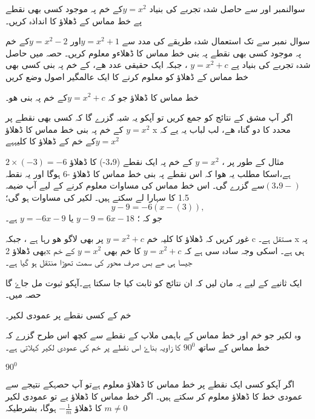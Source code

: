 

سوالنمبر  اور سے حاصل شدہ تجربے کی بنیاد \( y=x^{2} \)کے خم پہ موجود کسی بھی نقطے پے خط مماس کے ڈھلاؤ کا انداذہ کریں۔

 
سوال نمبر  سے  تک استعمال شدہ طریقے کی مدد سے \( y=x^{2} +1 \)اور \( y=x^{2} -2 \)کے خم پہ موجود کسی بھی نقطے پہ بنی خط مماس  کا ڈھلاءو معلوم کریں۔
حصہ  میں حاصل شدہ تجربے کی بنیاد پے
\( y=x^{2} +c \) 
، جبکہ  ایک حقیقی عدد ھے،   کے خم پہ بنی کسی بھی خط مماس کے ڈھلاؤ کو معلوم کرنے کا ایک عالمگیر اصول وضع کریں 

خط مماس کا ڈھلاؤ جو کہ  \( y=x^{2} +c \)کے خم پہ بنی ھو۔

اگر آپ مشق  کے نتائج کو جمع کریں تو آپکو یہ شبہ گزرے گا کہ کسی بھی نقطے پر\( y=x^{2}\) کے خم پہ بنی خط مماس کا ڈھلاؤ x محدد کا دو گناہ ھے، لب لباب یہ یے کہ \( y=x^{2}\)کے خم کے ڈھلاؤ کا کلیہہے  

مثال کے طور پر ،  \( y=x^{2}\) کے  خم پہ  ایک نقطے (3،9-) کا ڈھلاؤ \( 2 \times (-3) =-6 \) ہے،اسکا مطلب یہ ھوا کہ اس نقطے پہ بنی خط مماس کا ڈھلاؤ -6 ہوگا اور یہ نقطہ   \(  ( 3،9-)  \)سے گزرے گی۔
اس خط مماس کی مساوات معلوم کرنے کے لیے آپ ضیمہ 1.5 کا سہارا لے سکتے ہیں۔ لکیر کی مساوات ہو گی؛
\[y-9=-6(x-(3)),\]
جو کہ ؛
\(y-9 =6x-18\)
یا
\(y=-6x-9\)
ہے۔

غور کریں کہ ڈھلاؤ کا کلیہ  خم \( y=x^{2} +c \) پر بھی لاگو ھو رہا ہے ، جبکہ c مستقل ہے۔  x پہ بھی ڈھلاؤ 2x ہی ہے۔ اسکی وجہ سادہ سی ہے کہ  \( y=x^{2} +c \) کا خم بھی  \( y=x^{2}  \)  کے خم جیسا ہی ھے بس صرف   
محور کی سمت تھوڑا منتقل ہو گیا ہے۔

ایک ثانیے کے لیے یہ مان لیں کہ ان نتائج کو ثابت کیا جا سکتا ہے۔آپکو ثبوت مل جاۓ گا حصہ میں۔

خم کے کسی نقطے پر عمودی لکیر۔

وہ لکیر جو خم اور خط مماس کے باہمی ملاپ کے نقطے سے کچھ اس طرح گزرے کہ خط مماس کے ساتھ  \( 90^0\) کا زاویہ بناۓ  اس نقطے پر خم کی عمودی لکیر کہلاتی ہے۔

\( 90^0\)



اگر آپکو کسی ایک نقطے پر خط مماس کا ڈھلاؤ  معلوم ہےتو آپ  حصہکے نتیجے سے  عمودی خط کا ڈھلاؤ معلوم کر سکتے ہیں۔ اگر خط مماس کا ڈھلاؤ  
یے تو عمودی لکیر کا ڈھلاؤ \(- \frac{1}{m}\) ہوگا، بشرطیکہ \(m \ne 0\)

